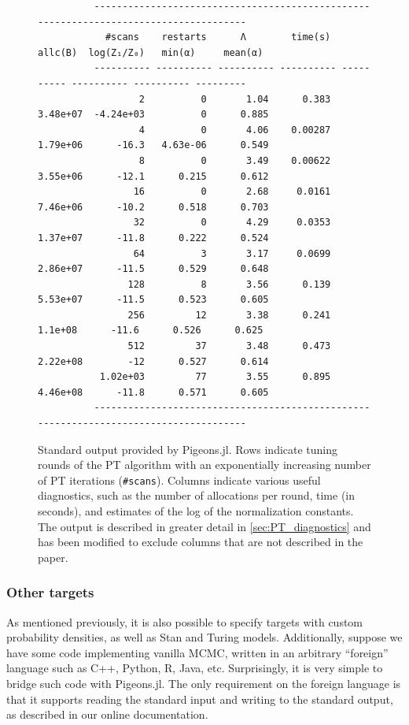 \begin{figure}[t]
    \centering
    \begin{lstlisting}
          --------------------------------------------------------------------------------------
            #scans    restarts      Λ        time(s)    allc(B)  log(Z₁/Z₀)   min(α)     mean(α)
          ---------- ---------- ---------- ---------- ---------- ---------- ---------- --------- 
                  2          0       1.04      0.383   3.48e+07  -4.24e+03          0      0.885
                  4          0       4.06    0.00287   1.79e+06      -16.3   4.63e-06      0.549
                  8          0       3.49    0.00622   3.55e+06      -12.1      0.215      0.612
                 16          0       2.68     0.0161   7.46e+06      -10.2      0.518      0.703
                 32          0       4.29     0.0353   1.37e+07      -11.8      0.222      0.524
                 64          3       3.17     0.0699   2.86e+07      -11.5      0.529      0.648
                128          8       3.56      0.139   5.53e+07      -11.5      0.523      0.605
                256         12       3.38      0.241    1.1e+08      -11.6      0.526      0.625
                512         37       3.48      0.473   2.22e+08        -12      0.527      0.614
           1.02e+03         77       3.55      0.895   4.46e+08      -11.8      0.571      0.605
          --------------------------------------------------------------------------------------
    \end{lstlisting}
    \caption{Standard output provided by Pigeons.jl. 
    Rows indicate tuning rounds of the PT algorithm with an exponentially increasing number 
    of PT iterations (\texttt{\#scans}). Columns indicate various useful diagnostics, 
    such as the number of allocations per round, time (in seconds), and estimates 
    of the log of the normalization constants. 
    The output is described in greater detail in \cref{sec:PT_diagnostics}
    and has been modified to exclude columns that are not described in the paper.}
    \label{fig:standard_out}
\end{figure}


\subsubsection{Other targets}
As mentioned previously, it is also possible to specify targets with custom 
probability densities, as well as Stan and Turing models. 
Additionally, suppose we have some code implementing vanilla MCMC, written 
in an arbitrary ``foreign'' language such as C++, Python, R, Java, etc. 
Surprisingly, it is very simple to bridge such code with Pigeons.jl. 
The only requirement on the foreign language is that it supports 
reading the standard input and writing to the standard output, 
as described in our online documentation.


